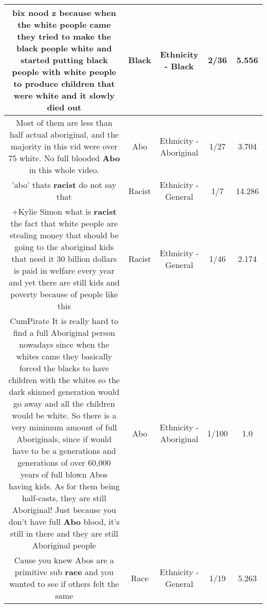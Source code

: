 \documentclass[11pt]{article}
\newlength\mylength
\begin{document}
\begin{center}
\begin{longtable}{|C{.65\mylength}|C{.30\mylength}|C{.12\mylength}|C{.12\mylength}|C{.12\mylength}|}
  \small bix nood z because when the white people came they tried to make the \textbf{black} people white and started putting \textbf{black} people with white people to produce children that were white and it slowly died out\normalsize   & Black & Ethnicity - Black & 2/36 & 5.556 \\  \hline
  \small Most of them are less than half actual aboriginal, and the majority in this vid were over 75 white. No full blooded \textbf{Abo} in this whole video.\normalsize   & Abo & Ethnicity - Aboriginal & 1/27 & 3.704 \\  \hline
  \small 'abo' thats \textbf{racist} do not say that\normalsize   & Racist & Ethnicity - General & 1/7 & 14.286 \\  \hline
  \small +Kylie Simon  what is \textbf{racist} the fact that white people are stealing money that should be going to the aboriginal kids that need it 30 billion dollars is paid in welfare every year and yet there are still kids and poverty because of people like this\normalsize   & Racist & Ethnicity - General & 1/46 & 2.174 \\  \hline
  \small CumPirate It is really hard to find a full Aboriginal person nowadays since when the whites came they basically forced the blacks to have children with the whites so the dark skinned generation would go away and all the children would be white. So there is a very minimum amount of full Aboriginals, since if would have to be a generations and generations of over 60,000 years of full blown Abos having kids. As for them being half-casts, they are still Aboriginal! Just because you don't have full \textbf{Abo} blood, it's still in there and they are still Aboriginal people\normalsize   & Abo & Ethnicity - Aboriginal & 1/100 & 1.0 \\  \hline
  \small Cause you knew Abos are a primitive sub \textbf{race} and you wanted to see if others felt the same\normalsize   & Race & Ethnicity - General & 1/19 & 5.263 \\  \hline

\end{longtable}
\end{center}
\end{document}
